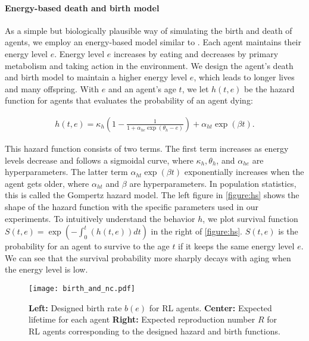 \paragraph{Energy-based death and birth model}
As a simple but biologically plausible way of simulating the birth and death of agents, we employ an energy-based model similar to \citet{hamonEcoevolutionaryDynamicsNonepisodic2023}. Each agent maintains their energy level $e$. Energy level $e$ increases by eating and decreases by primary metabolism and taking action in the environment. We design the agent's death and birth model to maintain a higher energy level $e$, which leads to longer lives and many offspring. With $e$ and an agent's age $t$, we let $h(t, e)$ be the hazard function for agents that evaluates the probability of an agent dying:

\begin{align}
  h(t, e) = \kappa_{h} \left(1 - \frac{1}{1 + \alpha_{he} \exp(\theta_{h} - e)} \right) + \alpha_{ht} \exp(\beta t). \label{eq:h}
\end{align}

This hazard function\label{eq:h} consists of two terms. The first term increases as energy levels decrease and follows a sigmoidal curve, where $\kappa_{h}, \theta_{h}$, and $\alpha_{he}$ are hyperparameters. The latter term $\alpha_{ht} \exp(\beta t)$ exponentially increases when the agent gets older, where $\alpha_{ht}$ and $\beta$ are hyperparameters. In population statistics, this is called the Gompertz hazard model\citep{gompertzXXIVNatureFunction1825,kirkwoodDecipheringDeathCommentary2015}. The left figure in \cref{figure:hs} shows the shape of the hazard function with the specific parameters used in our experiments. To intuitively understand the behavior $h$, we plot survival function $S(t, e) = \exp (-\int_{0}^{t}(h(t, e)) dt)$ in the right of \cref{figure:hs}. $S(t, e)$ is the probability for an agent to survive to the age $t$ if it keeps the same energy level $e$. We can see that the survival probability more sharply decays with aging when the energy level is low.

\begin{figure}[t]
  \centering{}
  \texttt{[image: birth\_and\_nc.pdf]}
  \caption{
    \textbf{Left:} Designed birth rate $b(e)$ for RL agents.
    \textbf{Center:} Expected lifetime for each agent
    \textbf{Right:} Expected reproduction number $R$ for RL agents corresponding to the designed hazard and birth functions.
  }\label{figure:bnc}
\end{figure}

